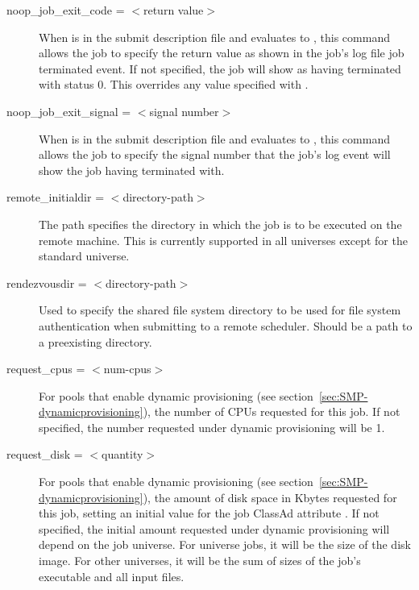 \begin{description}

\item[noop\_job\_exit\_code = $<$return value$>$]
When  is in the submit description file
and evaluates to ,
this command allows the job
to specify the return value as shown in the job's log file
job terminated event.
If not specified, the job will show as having terminated with status 0.
This overrides any value specified with .


\item[noop\_job\_exit\_signal = $<$signal number$>$]
When  is in the submit description file
and evaluates to ,
this command allows the job
to specify the signal number that the job's log event will show
the job having terminated with.


\item[remote\_initialdir = $<$directory-path$>$]
The path specifies the directory in which the job is to be
executed on the remote machine.  This is currently supported in all
universes except for the standard universe.


\item[rendezvousdir = $<$directory-path$>$] Used to specify the
shared file system directory to be used for file system authentication
when submitting to a remote scheduler.  Should be a path to a preexisting
directory.

\item[request\_cpus = $<$num-cpus$>$] For pools that enable
dynamic  provisioning
(see section~\ref{sec:SMP-dynamicprovisioning}),
the number of CPUs requested for this job.
If not specified, the number requested under dynamic  
provisioning will be 1.

\item[request\_disk = $<$quantity$>$] For pools that enable
dynamic  provisioning
(see section~\ref{sec:SMP-dynamicprovisioning}),
the amount of disk space in Kbytes requested for this job,
setting an initial value for the job ClassAd attribute .
If not specified, the initial amount requested under dynamic 
provisioning will depend on the job universe.
For  universe jobs, it will be the size of the disk image.
For other universes,
it will be the sum of sizes of the job's executable and all input files.


\end{description}
